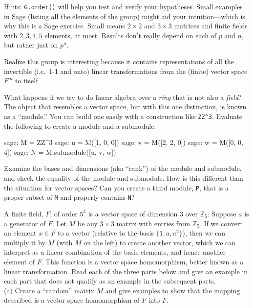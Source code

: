 %
Hints:  \verb?G.order()? will help you test and verify your hypotheses.  Small examples in Sage (listing all the elements of the group) might aid your intuition---which is why this is a Sage exercise.  Small means $2\times 2$ and $3\times 3$ matrices and finite fields with $2,3,4,5$ elements, at most.  Results don't really depend on each of $p$ and $n$, but rather just on $p^n$.\par
%
Realize this group is interesting because it contains representations of all the invertible (i.e.\ 1-1 and onto) linear transformations from the (finite) vector space $F^m$ to itself.
\begin{sageverbatim}\end{sageverbatim}
%
%
What happens if we try to do linear algebra over a \emph{ring} that is not also a \emph{field}?  The object that resembles a vector space, but with this one distinction, is known as a ``module.''  You can build one easily with a construction like \verb?ZZ^3?.  Evaluate the following to create a module and a submodule.
%
\begin{sageexample}
sage: M = ZZ^3
sage: u = M([1, 0, 0])
sage: v = M([2, 2, 0])
sage: w = M([0, 0, 4])
sage: N = M.submodule([u, v, w])
\end{sageexample}
%
Examine the bases and dimensions (aka ``rank'') of the module and submodule, and check the equality of the module and submodule.  How is this different than the situation for vector spaces?  Can you create a third module, \verb?P?, that is a proper subset of \verb?M? and properly contains \verb?N??
\begin{sageverbatim}\end{sageverbatim}
%
%
A finite field, $F$, of order $5^3$ is a vector space of dimension 3 over ${\mathbb Z}_5$.  Suppose $a$ is a generator of $F$.  Let $M$ be any $3\times 3$ matrix with entries from ${\mathbb Z}_5$.  If we convert an element $x\in F$ to a vector (relative to the basis $\{1,a,a^2\}$), then we can multiply it by $M$ (with $M$ on the left) to create another vector, which we can interpret as a linear combination of the basis elements, and hence another element of $F$.  This function is a vector space homomorphism, better known as a linear transformation.  Read each of the three parts below and give an example in each part that does not qualify as an example in the subsequent parts.\\
%
(a) Create a ``random'' matrix $M$ and give examples to show that the mapping described is a vector space homomorphism of $F$ into $F$.\\

